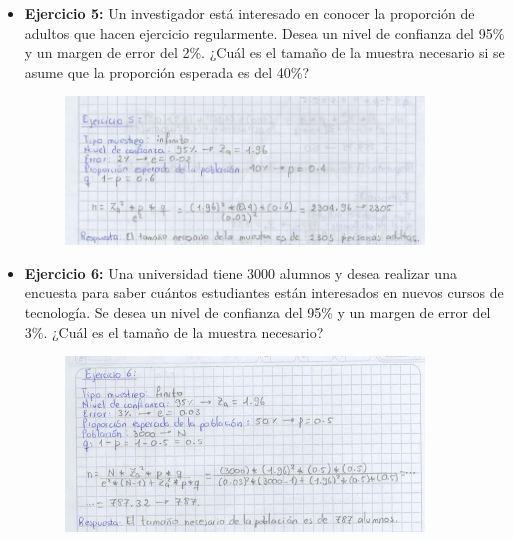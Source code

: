 \documentclass[12pt]{article}
\begin{document}
\begin{itemize}
            \newpage
            \item \textbf{Ejercicio 5:} Un investigador está interesado en conocer la proporción de adultos que hacen ejercicio regularmente. Desea un nivel de confianza del 95\% y un margen de error del 2\%. ¿Cuál es el tamaño de la muestra necesario si se asume que la proporción esperada es del 40\%?
                \begin{figure}[!h]
                    \centering
                    \includegraphics[width=0.9\textwidth]{Img/Tarea1_ej5.jpeg}
                \end{figure}
            
            \item \textbf{Ejercicio 6:} Una universidad tiene 3000 alumnos y desea realizar una encuesta para saber cuántos estudiantes están interesados en nuevos cursos de tecnología. Se desea un nivel de confianza del 95\% y un margen de error del 3\%. ¿Cuál es el tamaño de la muestra necesario?
                \begin{figure}[!h]
                    \centering
                    \includegraphics[width=0.9\textwidth]{Img/Tarea1_ej6.jpeg}
                \end{figure}

        \end{itemize}
\end{document}
